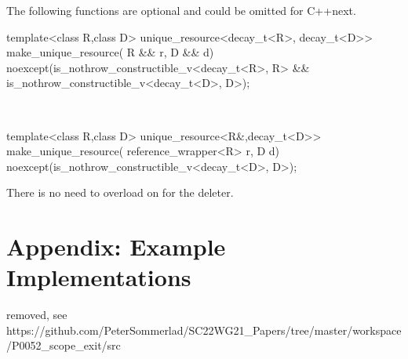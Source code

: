 \documentclass[ebook,11pt,article]{memoir}
\begin{document}
\begin{note}
The following functions are optional and could be omitted for C++next.
\end{note}

\begin{itemdecl}
template<class R,class D>
unique_resource<decay_t<R>, decay_t<D>>
make_unique_resource( R && r, D && d) 
noexcept(is_nothrow_constructible_v<decay_t<R>, R> &&
         is_nothrow_constructible_v<decay_t<D>, D>);
\end{itemdecl}

\begin{itemdescr}
\pnum
\returns \\
\end{itemdescr}


\begin{itemdecl}
template<class R,class D>
unique_resource<R&,decay_t<D>>
make_unique_resource( reference_wrapper<R> r, D d) 
noexcept(is_nothrow_constructible_v<decay_t<D>, D>);
\end{itemdecl}

\begin{itemdescr}
\pnum
\returns {}

\pnum \begin{note} There is no need to overload on  for the deleter. \end{note}
\end{itemdescr}


\newpage
\chapter{Appendix: Example Implementations}
removed, see \\
https://github.com/PeterSommerlad/SC22WG21_Papers/tree/master/workspace/P0052_scope_exit/src
\end{document}
